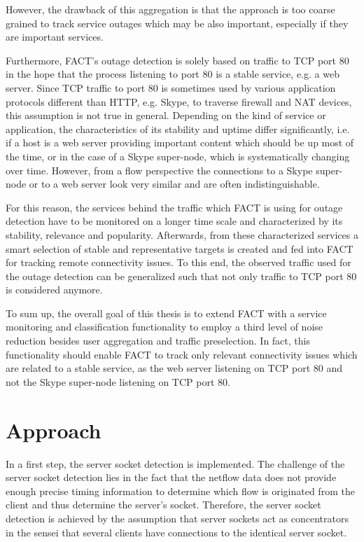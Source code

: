 \documentclass{sigcomm-alternate}
\begin{document}
However, the drawback of this aggregation is that the approach is too
coarse grained to track service outages which may be also important,
especially if they are important services.

Furthermore, FACT's outage detection is solely based on traffic to
TCP port 80 in the hope that the process listening to port 80 is a
stable service, e.g. a web server. Since TCP traffic to port 80 is
sometimes used by various application protocols different than HTTP,
e.g. Skype, to traverse firewall and NAT devices, this assumption is
not true in general. Depending on the kind of service or application,
the characteristics of its stability and uptime differ significantly,
i.e. if a host is a web server providing important content which should
be up most of the time, or in the case of a Skype super-node, which is
systematically changing over time. However, from a flow perspective the
connections to a Skype super-node or to a web server look very similar
and are often indistinguishable.

For this reason, the services behind the traffic which FACT is using
for outage detection have to be monitored on a longer time scale and
characterized by its stability, relevance and popularity. Afterwards,
from these characterized services a smart selection of stable and
representative targets is created and fed into FACT for tracking remote
connectivity issues. To this end, the observed traffic used for the
outage detection can be generalized such that not only traffic to TCP
port 80 is considered anymore.

To sum up, the overall goal of this thesis is to extend FACT with
a service monitoring and classification functionality to employ a
third level of noise reduction besides user aggregation and traffic
preselection. In fact, this functionality should enable FACT to track
only relevant connectivity issues which are related to a stable service,
as the web server listening on TCP port 80 and not the Skype super-node
listening on TCP port 80.

\section{Approach}

In a first step, the server socket detection is implemented. The
challenge of the server socket detection lies in the fact that the
netflow data does not provide enough precise timing information to
determine which flow is originated from the client and thus determine
the server's socket. Therefore, the server socket detection is
achieved by the assumption that server sockets act as concentrators
in the sensei that several clients have connections to the identical
server socket.
\end{document}
